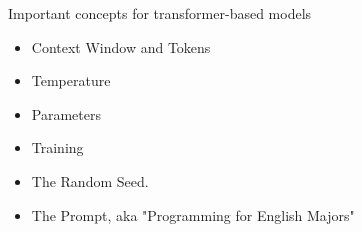 \documentclass{beamer}
\begin{document}
\begin{frame}[plain]
\end{frame}


\begin{frame}{Important concepts for transformer-based models}
	\begin{itemize}
		\item Context Window and Tokens
		\pause
		\item Temperature
		\pause
		\item Parameters
		\pause
		\item Training
		\pause 
		\item The Random Seed.
		\pause
		\item The Prompt, aka "Programming for English Majors"
	\end{itemize}
\end{frame}
\end{document}
